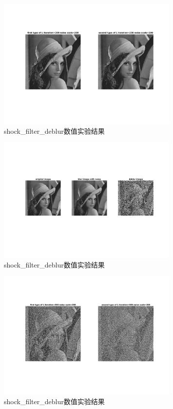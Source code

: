 \documentclass[a4paper, UTF8]{ctexrep}
\begin{document}
				\begin{figure}[htbp!]
					\centering
					\includegraphics[width=0.8\textwidth]{hw2_fig10.png}
					\caption{shock\_filter\_deblur数值实验结果}
					\label{}
				\end{figure}
				\begin{figure}[htbp!]
					\centering
					\includegraphics[width=0.8\textwidth]{hw2_fig11.png}
					\caption{shock\_filter\_deblur数值实验结果}
					\label{}
				\end{figure}
				\begin{figure}[htbp!]
					\centering
					\includegraphics[width=0.8\textwidth]{hw2_fig12.png}
					\caption{shock\_filter\_deblur数值实验结果}
					\label{}
				\end{figure}
\end{document}
